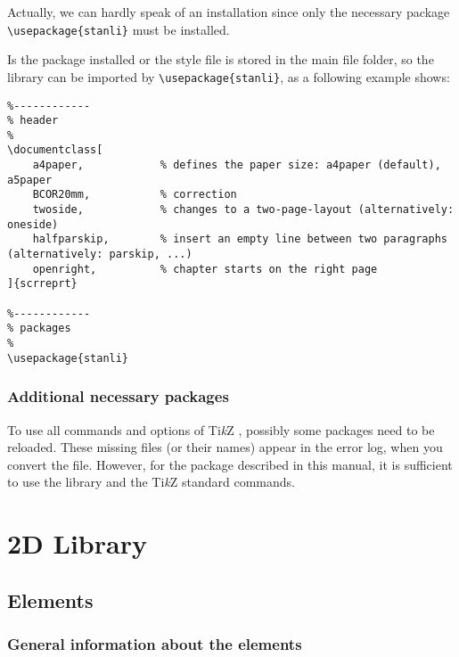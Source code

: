 \documentclass[%
  a4paper,
  BCOR20mm,
  pointlessnumbers,
  twoside,
  halfparskip,
  openright,
]{scrreprt}
\newcommand{\tikzsym}{Ti\emph{k}Z }
\begin{document}
Actually, we can hardly speak of an installation since only the necessary package \lstinline|\usepackage{stanli}| must be installed.

Is the package installed or the style file is stored in the main file folder, so the library can be imported by \lstinline|\usepackage{stanli}|, as a following example shows:

\begin{lstlisting}
%------------
% header
%	
\documentclass[
	a4paper,            % defines the paper size: a4paper (default), a5paper
	BCOR20mm,           % correction
	twoside,            % changes to a two-page-layout (alternatively: oneside)
	halfparskip,        % insert an empty line between two paragraphs (alternatively: parskip, ...)
	openright,          % chapter starts on the right page
]{scrreprt}

%------------
% packages
%
\usepackage{stanli}
\end{lstlisting}

\section{Additional necessary packages}
\label{sec:WeitereNotwendigePackages}

To use all commands and options of \tikzsym, possibly some packages need to be reloaded. These missing files (or their names) appear in the error log, when you convert the file. However, for the package described in this manual, it is sufficient to use the library and the \tikzsym standard commands.


\part{2D Library}
\label{part:2dlib}



\chapter{Elements}
\label{sec:Elemente}


\section{General information about the elements}
\label{sec:AllgemeinesZuDenElementen}
\end{document}
